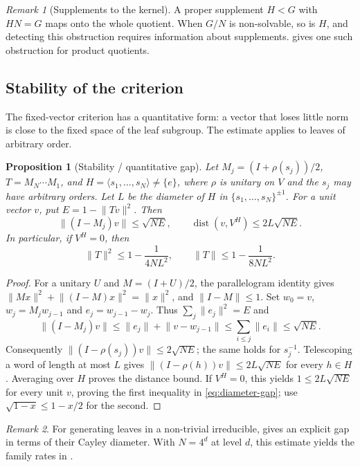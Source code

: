 \documentclass[11pt]{amsart}
\newtheorem{proposition}[proposition]{Proposition}
\theoremstyle{definition}
\theoremstyle{remark}
\newtheorem{remark}[remark]{Remark}
\theoremstyle{plain}
\theoremstyle{plain}
\numberwithin{equation}{section}
\newcommand{\norm}[1]{\lVert #1 \rVert}
\newcommand{\opn}[1]{\norm{#1}}
\begin{document}
\begin{remark}[Supplements to the kernel]
\label{rem:residue}
A proper supplement $H<G$ with $HN=G$ maps onto the whole quotient.
When $G/N$ is non-solvable, so is $H$, and detecting this obstruction
requires information about supplements. 
gives one such obstruction for product quotients.
\end{remark}

\subsection{Stability of the criterion}

The fixed-vector criterion has a quantitative form: a vector that loses
little norm is close to the fixed space of the leaf subgroup. The estimate
applies to leaves of arbitrary order.

\begin{proposition}[Stability / quantitative gap]
\label{prop:stability}
Let $M_j=(I+\rho(s_j))/2$, $T=M_N\cdots M_1$, and
$H=\langle s_1,\ldots,s_N\rangle\ne\{e\}$, where $\rho$ is unitary on $V$ and
the $s_j$ may have arbitrary orders. Let $L$ be the diameter of $H$ in
$\{s_1,\ldots,s_N\}^{\pm1}$. For a unit vector $v$, put
$E=1-\norm{Tv}^2$. Then
\[
 \norm{(I-M_j)v}\le\sqrt{NE},\qquad
 \operatorname{dist}(v,V^H)\le2L\sqrt{NE}.
\]
In particular, if $V^H=0$, then
\begin{equation}\label{eq:diameter-gap}
 \opn T^2\le1-\frac1{4NL^2},\qquad
 \opn T\le1-\frac1{8NL^2}.
\end{equation}
\end{proposition}
\begin{proof}
For a unitary $U$ and $M=(I+U)/2$, the parallelogram identity gives
$\norm{Mx}^2+\norm{(I-M)x}^2=\norm x^2$, and $\opn{I-M}\le1$.
Set $w_0=v$, $w_j=M_jw_{j-1}$ and $e_j=w_{j-1}-w_j$. Thus
$\sum_j\norm{e_j}^2=E$ and
\[
 \norm{(I-M_j)v}\le\norm{e_j}+\norm{v-w_{j-1}}
 \le\sum_{i\le j}\norm{e_i}\le\sqrt{NE}.
\]
Consequently $\norm{(I-\rho(s_j))v}\le2\sqrt{NE}$; the same holds
for $s_j^{-1}$. Telescoping a word of length at most $L$ gives
$\norm{(I-\rho(h))v}\le2L\sqrt{NE}$ for every $h\in H$.
Averaging over $H$ proves the distance bound. If $V^H=0$, this yields
$1\le2L\sqrt{NE}$ for every unit $v$, proving the first inequality in
\eqref{eq:diameter-gap}; use $\sqrt{1-x}\le1-x/2$ for the second.
\end{proof}

\begin{remark}
For generating leaves in a non-trivial irreducible, 
gives an explicit gap in terms of their Cayley diameter. With $N=4^d$
at level $d$, this estimate yields the family rates in
.
\end{remark}
\end{document}
